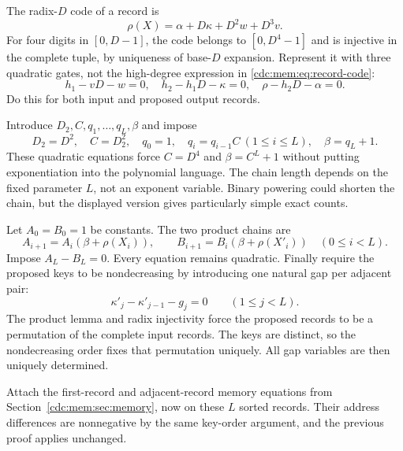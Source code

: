 \documentclass[11pt,a4paper]{article}
\theoremstyle{definition}
\theoremstyle{remark}
\begin{document}
The radix-$D$ code of a record is
\begin{equation}\label{cdc:mem:eq:record-code}
 \rho(X)=\alpha+D\kappa+D^2w+D^3v.
\end{equation}
For four digits in $[0,D-1]$, the code belongs to $[0,D^4-1]$ and is injective
in the complete tuple, by uniqueness of base-$D$ expansion. Represent it with
three quadratic gates, not the high-degree expression in
\eqref{cdc:mem:eq:record-code}:
\begin{equation}\label{cdc:mem:eq:horner}
 h_1-vD-w=0,\quad h_2-h_1D-\kappa=0,\quad \rho-h_2D-\alpha=0.
\end{equation}
Do this for both input and proposed output records.

Introduce $D_2,C,q_1,\ldots,q_L,\beta$ and impose
\begin{equation}\label{cdc:mem:eq:large-base}
 D_2=D^2,\quad C=D_2^2,\quad q_0=1,\quad
 q_i=q_{i-1}C\ (1\leq i\leq L),\quad\beta=q_L+1.
\end{equation}
These quadratic equations force $C=D^4$ and $\beta=C^L+1$ without putting
exponentiation into the polynomial language. The chain length depends on the
fixed parameter $L$, not an exponent variable. Binary powering could shorten
the chain, but the displayed version gives particularly simple exact counts.

Let $A_0=B_0=1$ be constants. The two product chains are
\begin{equation}\label{cdc:mem:eq:product-chains}
 A_{i+1}=A_i(\beta+\rho(X_i)),\qquad
 B_{i+1}=B_i(\beta+\rho(X'_i))\quad(0\leq i<L).
\end{equation}
Impose $A_L-B_L=0$. Every equation remains quadratic. Finally require the
proposed keys to be nondecreasing by introducing one natural gap per adjacent
pair:
\begin{equation}\label{cdc:mem:eq:ordered-keys}
 \kappa'_j-\kappa'_{j-1}-g_j=0\qquad(1\leq j<L).
\end{equation}
The product lemma and radix injectivity force the proposed records to be a
permutation of the complete input records. The keys are distinct, so the
nondecreasing order fixes that permutation uniquely. All gap variables are
then uniquely determined.

Attach the first-record and adjacent-record memory equations from
Section~\ref{cdc:mem:sec:memory}, now on these $L$ sorted records. Their address
differences are nonnegative by the same key-order argument, and the previous
proof applies unchanged.
\end{document}
